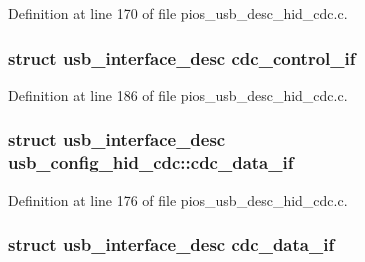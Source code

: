 Definition at line 170 of file pios\-\_\-usb\-\_\-desc\-\_\-hid\-\_\-cdc.\-c.

\hypertarget{group___p_i_o_s___u_s_b___d_e_s_c_ga9ca646cc7183c87c14d220ac2ccaba38}{
\subsubsection[{cdc\-\_\-control\-\_\-if}]{\setlength{\rightskip}{0pt plus 5cm}struct {\bf usb\-\_\-interface\-\_\-desc} cdc\-\_\-control\-\_\-if}}\label{group___p_i_o_s___u_s_b___d_e_s_c_ga9ca646cc7183c87c14d220ac2ccaba38}


Definition at line 186 of file pios\-\_\-usb\-\_\-desc\-\_\-hid\-\_\-cdc.\-c.

\hypertarget{group___p_i_o_s___u_s_b___d_e_s_c_ga80b1d19d38b5379618c5e66f0da9dcb2}{
\subsubsection[{cdc\-\_\-data\-\_\-if}]{\setlength{\rightskip}{0pt plus 5cm}struct {\bf usb\-\_\-interface\-\_\-desc} usb\-\_\-config\-\_\-hid\-\_\-cdc\-::cdc\-\_\-data\-\_\-if}}\label{group___p_i_o_s___u_s_b___d_e_s_c_ga80b1d19d38b5379618c5e66f0da9dcb2}


Definition at line 176 of file pios\-\_\-usb\-\_\-desc\-\_\-hid\-\_\-cdc.\-c.

\hypertarget{group___p_i_o_s___u_s_b___d_e_s_c_gab685a3142df1c86fb19d69d84a296989}{
\subsubsection[{cdc\-\_\-data\-\_\-if}]{\setlength{\rightskip}{0pt plus 5cm}struct {\bf usb\-\_\-interface\-\_\-desc} cdc\-\_\-data\-\_\-if}}\label{group___p_i_o_s___u_s_b___d_e_s_c_gab685a3142df1c86fb19d69d84a296989}


